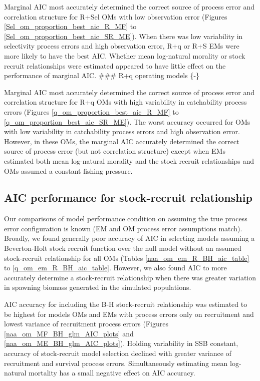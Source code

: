 \documentclass[
  12pt,
]{article}
\begin{document}
Marginal AIC most accurately determined the correct source of process
error and correlation structure for R+Sel OMs with low observation error
(Figures \ref{Sel_om_proportion_best_aic_R_MF} to
\ref{Sel_om_proportion_best_aic_SR_ME}). When there was low variability
in selectivity process errors and high observation error, R+q or R+S EMs
were more likely to have the best AIC. Whether mean log-natural morality
or stock recruit relationships were estimated appeared to have little
effect on the performance of marginal AIC. \#\#\# R+q operating models
\{-\}

Marginal AIC most accurately determined the correct source of process
error and correlation structure for R+q OMs with high variability in
catchability process errors (Figures \ref{q_om_proportion_best_aic_R_MF}
to \ref{q_om_proportion_best_aic_SR_ME}). The worst accuracy occurred
for OMs with low variability in catchability process errors and high
observation error. However, in these OMs, the marginal AIC accurately
determined the correct source of process error (but not correlation
structure) except when EMs estimated both mean log-natural morality and
the stock recruit relationships and OMs assumed a constant fishing
pressure.

\hypertarget{aic-performance-for-stock-recruit-relationship}{%
\subsection*{AIC performance for stock-recruit
relationship}\label{aic-performance-for-stock-recruit-relationship}}

Our comparisons of model performance condition on assuming the true
process error configuration is known (EM and OM process error
assumptions match). Broadly, we found generally poor accuracy of AIC in
selecting models assuming a Beverton-Holt stock recruit function over
the null model without an assumed stock-recruit relationship for all OMs
(Tables \ref{naa_om_em_R_BH_aic_table} to \ref{q_om_em_R_BH_aic_table}.
However, we also found AIC to more accurately determine a stock-recruit
relationship when there was greater variation in spawning biomass
generated in the simulated populations.

AIC accuracy for including the B-H stock-recruit relationship was
estimated to be highest for models OMs and EMs with process errors only
on recruitment and lowest variance of recruitment process errors
(Figures \ref{naa_om_MF_BH_glm_AIC_plots} and
\ref{naa_om_ME_BH_glm_AIC_plots}). Holding variability in SSB constant,
accuracy of stock-recruit model selection declined with greater variance
of recruitment and survival process errors. Simultaneously estimating
mean log-natural mortality has a small negative effect on AIC accuracy.
\end{document}
